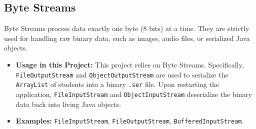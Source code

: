 \documentclass[12pt, a4paper]{article}
\begin{document}
    \subsection*{Byte Streams}                                                                                                                                             
    Byte Streams process data exactly one byte (8 bits) at a time. They are strictly used for handling raw binary data, such as images, audio files, or serialized Java    
  objects.                                                                                                                                                                 
    \begin{itemize}                                                                                                                                                        
        \item \textbf{Usage in this Project:} This project relies on Byte Streams. Specifically, \texttt{FileOutputStream} and \texttt{ObjectOutputStream} are used to     
  serialize the \texttt{ArrayList} of students into a binary \texttt{.ser} file. Upon restarting the application, \texttt{FileInputStream} and \texttt{ObjectInputStream}  
  deserialize the binary data back into living Java objects.                                                                                                               
        \item \textbf{Examples:} \texttt{FileInputStream}, \texttt{FileOutputStream}, \texttt{BufferedInputStream}.                                                        
    \end{itemize}                                                                                                                                                          
                                                                                                                                                                           
\end{document}
